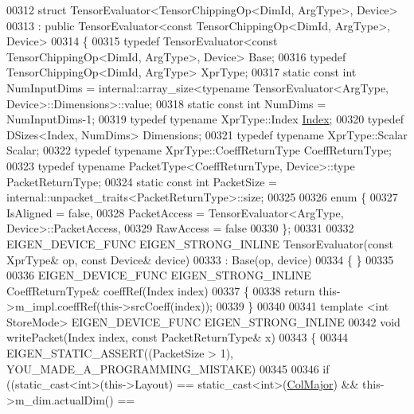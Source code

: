 \begin{DoxyCode}
00312 \textcolor{keyword}{struct }TensorEvaluator<TensorChippingOp<DimId, ArgType>, Device>
00313   : \textcolor{keyword}{public} TensorEvaluator<const TensorChippingOp<DimId, ArgType>, Device>
00314 \{
00315   \textcolor{keyword}{typedef} TensorEvaluator<const TensorChippingOp<DimId, ArgType>, Device> Base;
00316   \textcolor{keyword}{typedef} TensorChippingOp<DimId, ArgType> XprType;
00317   \textcolor{keyword}{static} \textcolor{keyword}{const} \textcolor{keywordtype}{int} NumInputDims = internal::array\_size<typename TensorEvaluator<ArgType,
       Device>::Dimensions>::value;
00318   \textcolor{keyword}{static} \textcolor{keyword}{const} \textcolor{keywordtype}{int} NumDims = NumInputDims-1;
00319   \textcolor{keyword}{typedef} \textcolor{keyword}{typename} XprType::Index \hyperlink{namespace_eigen_a62e77e0933482dafde8fe197d9a2cfde}{Index};
00320   \textcolor{keyword}{typedef} DSizes<Index, NumDims> Dimensions;
00321   \textcolor{keyword}{typedef} \textcolor{keyword}{typename} XprType::Scalar Scalar;
00322   \textcolor{keyword}{typedef} \textcolor{keyword}{typename} XprType::CoeffReturnType CoeffReturnType;
00323   \textcolor{keyword}{typedef} \textcolor{keyword}{typename} PacketType<CoeffReturnType, Device>::type PacketReturnType;
00324   \textcolor{keyword}{static} \textcolor{keyword}{const} \textcolor{keywordtype}{int} PacketSize = internal::unpacket\_traits<PacketReturnType>::size;
00325 
00326   \textcolor{keyword}{enum} \{
00327     IsAligned = \textcolor{keyword}{false},
00328     PacketAccess = TensorEvaluator<ArgType, Device>::PacketAccess,
00329     RawAccess = \textcolor{keyword}{false}
00330   \};
00331 
00332   EIGEN\_DEVICE\_FUNC EIGEN\_STRONG\_INLINE TensorEvaluator(\textcolor{keyword}{const} XprType& op, \textcolor{keyword}{const} Device& device)
00333     : Base(op, device)
00334     \{ \}
00335 
00336   EIGEN\_DEVICE\_FUNC EIGEN\_STRONG\_INLINE CoeffReturnType& coeffRef(Index index)
00337   \{
00338     \textcolor{keywordflow}{return} this->m\_impl.coeffRef(this->srcCoeff(index));
00339   \}
00340 
00341   \textcolor{keyword}{template} <\textcolor{keywordtype}{int} StoreMode> EIGEN\_DEVICE\_FUNC EIGEN\_STRONG\_INLINE
00342   \textcolor{keywordtype}{void} writePacket(Index index, \textcolor{keyword}{const} PacketReturnType& x)
00343   \{
00344     EIGEN\_STATIC\_ASSERT((PacketSize > 1), YOU\_MADE\_A\_PROGRAMMING\_MISTAKE)
00345 
00346     \textcolor{keywordflow}{if} ((static\_cast<int>(this->Layout) == static\_cast<int>(\hyperlink{group__enums_ggaacded1a18ae58b0f554751f6cdf9eb13a0cbd4bdd0abcfc0224c5fcb5e4f6669a}{ColMajor}) && this->m\_dim.actualDim() ==

\end{DoxyCode}
